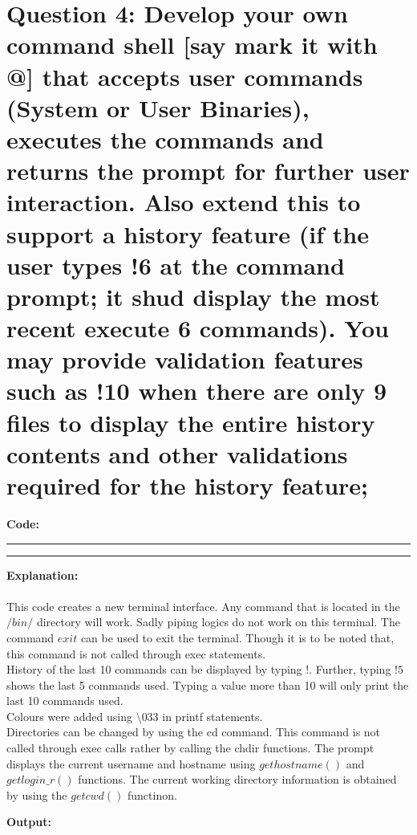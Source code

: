 \documentclass{article}
\begin{document}
\bigskip


\section*{Question 4: Develop your own command shell [say mark it with @] that accepts user commands (System or User Binaries), executes the commands and returns the prompt for further user interaction. Also extend this to support a history feature (if the user types !6 at the command prompt; it shud display the most recent execute 6 commands). You may provide validation features such as !10 when there are only 9 files to display the entire history contents and other validations required for the history feature;}
\bigskip

\textbf{\Large Code:}
\smallskip
\par\noindent\rule{\textwidth}{0.4pt}

\par\noindent\rule{\textwidth}{0.4pt}

\bigskip
\noindent
\textbf{\Large Explanation: } \\
  \\This code creates a new terminal interface. Any command that is located in the
  $/bin/$ directory will work. Sadly piping logics do not work on this terminal. The 
  command $exit$ can be used to exit the terminal. Though it is to be noted that, 
  this command is not called through exec statements. \newline \\
  History of the last 10 commands can be displayed by typing $!$. Further, typing $! 5$
  shows the last 5 commands used. Typing a value more than 10 will only print the 
  last 10 commands used. \newline \\
  Colours were added using $\setminus 033$ in printf statements. \newline \\
  Directories can be changed by using the cd command. This command is not called
  through exec calls rather by calling the chdir functions. The prompt displays the
  current username and hostname using $gethostname()$ and $getlogin\_r()$ functions. The
  current working directory information is obtained by using the $getcwd()$ functinon.

\bigskip
\noindent
\textbf{\Large Output:}
\end{document}
